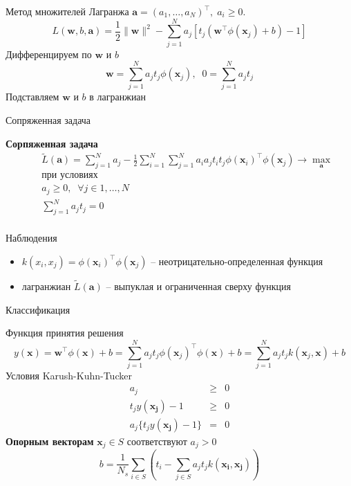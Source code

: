 \documentclass[10pt]{beamer}
\begin{document}
\begin{frame}{}

Метод множителей Лагранжа $\mathbf{a} = (a_1, \ldots, a_N)^\top,\;a_i \geq 0$.
\[
L(\mathbf{w}, b, \mathbf{a}) = \frac 1 2 \|\mathbf{w}\|^2 - \sum_{j=1}^N a_j [t_j (\mathbf{w}^\top \phi(\mathbf{x}_j) + b) - 1]
\]
Дифференцируем по $\mathbf{w}$ и $b$
\[
\mathbf{w} = \sum_{j=1}^N a_j t_j \phi(\mathbf{x}_j), \;\; 0 = \sum_{j=1}^N a_j t_j
\]
Подставляем $\mathbf{w}$ и $b$ в лагранжиан

\end{frame}

\begin{frame}{Сопряженная задача}

\begin{framed}
{\bf Сорпяженная задача}
\begin{eqnarray*}
&& \tilde{L}(\mathbf{a}) = \sum_{j=1}^N a_j - \frac{1}{2} \sum_{i=1}^N \sum_{j=1}^N a_i a_j t_i t_j \phi(\mathbf{x}_i)^\top \phi(\mathbf{x}_j) \rightarrow \max_{\mathbf{a}} \\
&& \text{при условиях} \\
&& a_j \geq 0, \;\; \forall j \in 1,\ldots,N \\
&& \sum_{j=1}^N a_j t_j = 0\\
\end{eqnarray*}
\end{framed}

Наблюдения
\begin{itemize}
\item $k(x_i, x_j) = \phi(\mathbf{x}_i)^\top \phi(\mathbf{x}_j)$ -- неотрицательно-определенная функция
\item лагранжиан $\tilde L(\mathbf{a})$ -- выпуклая и ограниченная сверху функция
\end{itemize}

\end{frame}

\begin{frame}{Классификация}

Функция принятия решения
\[
y(\mathbf{x}) = \mathbf{w}^\top \phi(\mathbf{x}) + b = \sum_{j=1}^N a_j t_j \phi(\mathbf{x}_j)^\top  \phi(\mathbf{x}) + b = \sum_{j=1}^N a_j t_j k(\mathbf{x}_j, \mathbf{x}) + b
\]
Условия Karush-Kuhn-Tucker
\begin{eqnarray*}
a_j &\geq& 0 \\
t_j y(\mathbf{x_j}) - 1 &\geq& 0 \\
a_j \{t_j y(\mathbf{x_j}) - 1\} &=& 0
\end{eqnarray*}
{\bf Опорным векторам} $\mathbf{x}_j \in S$ соответствуют $a_j > 0$
\[
b = \frac{1}{N_s} \sum_{i \in S} \left( t_i - \sum_{j \in S} a_j t_j k(\mathbf{x_i}, \mathbf{x_j})\right)
\]

\end{frame}
\end{document}
